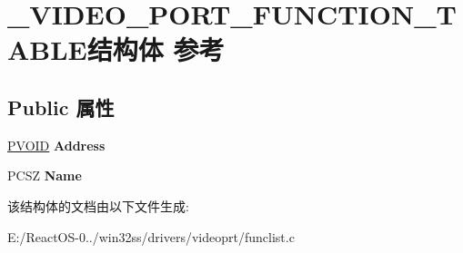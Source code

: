 \hypertarget{struct___v_i_d_e_o___p_o_r_t___f_u_n_c_t_i_o_n___t_a_b_l_e}{}\section{\+\_\+\+V\+I\+D\+E\+O\+\_\+\+P\+O\+R\+T\+\_\+\+F\+U\+N\+C\+T\+I\+O\+N\+\_\+\+T\+A\+B\+L\+E结构体 参考}
\label{struct___v_i_d_e_o___p_o_r_t___f_u_n_c_t_i_o_n___t_a_b_l_e}
\subsection*{Public 属性}
\begin{DoxyCompactItemize}
\item 
\mbox{\label{struct___v_i_d_e_o___p_o_r_t___f_u_n_c_t_i_o_n___t_a_b_l_e_a5cff6d4ae5a47d8904f9491441f15d36}} 
\hyperlink{interfacevoid}{P\+V\+O\+ID} {\bfseries Address}
\item 
\mbox{\label{struct___v_i_d_e_o___p_o_r_t___f_u_n_c_t_i_o_n___t_a_b_l_e_aab0044c44f8b060333cb8c9f5aa78743}} 
P\+C\+SZ {\bfseries Name}
\end{DoxyCompactItemize}


该结构体的文档由以下文件生成\+:\begin{DoxyCompactItemize}
\item 
E\+:/\+React\+O\+S-\/0../win32ss/drivers/videoprt/funclist.\+c\end{DoxyCompactItemize}
